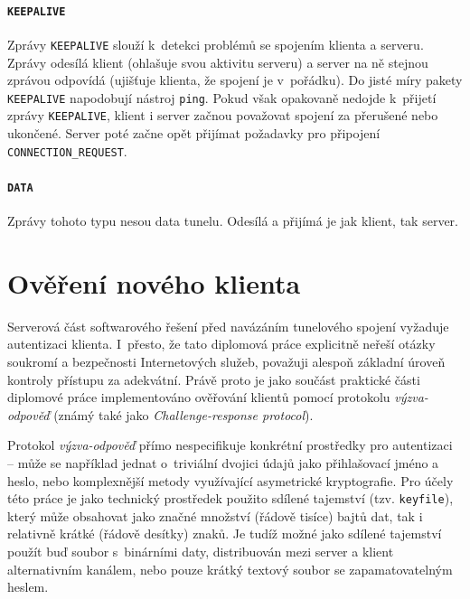 \documentclass[thesis=M,czech]{FITthesis}[2012/10/20]
\begin{document}
  \paragraph{\texttt{KEEPALIVE}}
    
    Zprávy \texttt{KEEPALIVE} slouží k~detekci problémů se spojením klienta a serveru. Zprávy odesílá klient (ohlašuje svou aktivitu serveru) a server na ně stejnou zprávou odpovídá (ujišťuje klienta, že spojení je v~pořádku). Do jisté míry pakety \texttt{KEEPALIVE} napodobují nástroj \texttt{ping}. Pokud však opakovaně nedojde k~přijetí zprávy \texttt{KEEPALIVE}, klient i server začnou považovat spojení za přerušené nebo ukončené. Server poté začne opět přijímat požadavky pro připojení \texttt{CONNECTION\_REQUEST}.
  
  \paragraph{\texttt{DATA}}
  
    Zprávy tohoto typu nesou data tunelu. Odesílá a přijímá je jak klient, tak server.
    
\section{Ověření nového klienta}
\label{sec:challenge-response}

Serverová část softwarového řešení před navázáním tunelového spojení vyžaduje autentizaci klienta. I~přesto, že tato diplomová práce explicitně neřeší otázky soukromí a bezpečnosti Internetových služeb, považuji alespoň základní úroveň kontroly přístupu za adekvátní. Právě proto je jako součást praktické části diplomové práce implementováno ověřování klientů pomocí protokolu \textit{výzva-odpověď} (známý také jako \textit{Challenge-response protocol}).

Protokol \textit{výzva-odpověď} přímo nespecifikuje konkrétní prostředky pro autentizaci -- může se například jednat o~triviální dvojici údajů jako přihlašovací jméno a heslo, nebo komplexnější metody využívající asymetrické kryptografie. Pro účely této práce je jako technický prostředek použito sdílené tajemství (tzv. \texttt{keyfile}), který může obsahovat jako značné množství (řádově tisíce) bajtů dat, tak i relativně krátké (řádově desítky) znaků. Je tudíž možné jako sdílené tajemství použít buď soubor s~binárními daty, distribuován mezi server a klient alternativním kanálem, nebo pouze krátký textový soubor se zapamatovatelným heslem.
\end{document}
